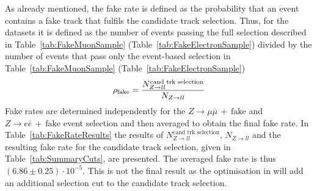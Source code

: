 As already mentioned, the fake rate is defined as the probability that an event contains a fake track that fulfils the candidate track selection.
Thus, for the \Zlep datasets it is defined as the number of events passing the full selection described in Table~\ref{tab:FakeMuonSample} (Table~\ref{tab:FakeElectronSample}) divided by the number of events that pass only the event-based selection in Table~\ref{tab:FakeMuonSample} (Table~\ref{tab:FakeElectronSample})
\begin{equation}
\rho_{\text{fake}} = \frac{N_{Z\rightarrow ll}^{\text{cand trk selection}}}{N_{Z\rightarrow ll}}
\end{equation}
Fake rates are determined independently for the $Z\rightarrow \mu\bar{\mu}\,+\,\text{fake}$ and $Z\rightarrow e\bar{e}\,+\,\text{fake}$ event selection and then averaged to obtain the final fake rate. 
In Table~\ref{tab:FakeRateResults} the results of $N_{Z\rightarrow ll}^{\text{cand trk selection}}$, $N_{Z\rightarrow ll}$ and the resulting fake rate for the candidate track selection, given in Table~\ref{tab:SummaryCuts}, are presented.
The averaged fake rate is thus $\left( 6.86 \pm 0.25 \right) \cdot 10^{-5}$.
This is not the final result as the optimisation in \pt will add an additional \pt selection cut to the candidate track selection.

\renewcommand{\arraystretch}{1.5}
\begin{table}[!b]
\centering
\caption{Results of $N_{Z\rightarrow ll}^{\text{cand trk selection}}$, $N_{Z\rightarrow ll}$ and \fakerate for the $Z\rightarrow \mu\bar{\mu}\,+\,\text{fake}$ (Table~\ref{tab:FakeMuonSample}) and $Z\rightarrow e\bar{e}\,+\,\text{fake}$ (Table~\ref{tab:FakeElectronSample}) selection.}
\label{tab:FakeRateResults}
\end{table}  


